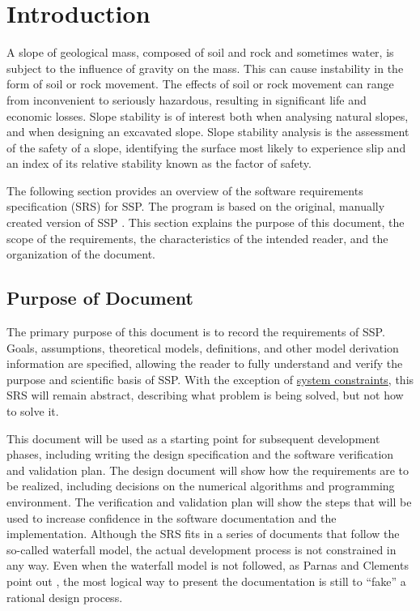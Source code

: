 \documentclass[12pt]{article}
\begin{document}
\section{Introduction}
\label{Sec:Intro}
A slope of geological mass, composed of soil and rock and sometimes water, is subject to the influence of gravity on the mass. This can cause instability in the form of soil or rock movement. The effects of soil or rock movement can range from inconvenient to seriously hazardous, resulting in significant life and economic losses. Slope stability is of interest both when analysing natural slopes, and when designing an excavated slope. Slope stability analysis is the assessment of the safety of a slope, identifying the surface most likely to experience slip and an index of its relative stability known as the factor of safety.

The following section provides an overview of the software requirements specification (SRS) for SSP. The program is based on the original, manually created version of SSP \cite{sspOriginal}. This section explains the purpose of this document, the scope of the requirements, the characteristics of the intended reader, and the organization of the document.

\subsection{Purpose of Document}
\label{Sec:DocPurpose}
The primary purpose of this document is to record the requirements of SSP. Goals, assumptions, theoretical models, definitions, and other model derivation information are specified, allowing the reader to fully understand and verify the purpose and scientific basis of SSP. With the exception of \hyperref[Sec:SysConstraints]{system constraints}, this SRS will remain abstract, describing what problem is being solved, but not how to solve it.

This document will be used as a starting point for subsequent development phases, including writing the design specification and the software verification and validation plan. The design document will show how the requirements are to be realized, including decisions on the numerical algorithms and programming environment. The verification and validation plan will show the steps that will be used to increase confidence in the software documentation and the implementation. Although the SRS fits in a series of documents that follow the so-called waterfall model, the actual development process is not constrained in any way. Even when the waterfall model is not followed, as Parnas and Clements point out \cite{parnasClements1986}, the most logical way to present the documentation is still to ``fake'' a rational design process.
\end{document}
